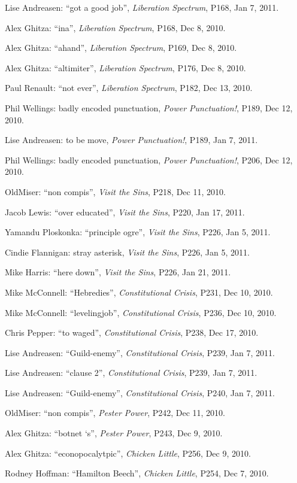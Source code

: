 \begin{flushleft}
Lise Andreasen: “got a good job”, \emph{Liberation Spectrum}, P168, 
Jan 7, 2011.

Alex Ghitza: “ina”, \emph{Liberation Spectrum}, P168, Dec 8, 2010.

Alex Ghitza: “ahand”, \emph{Liberation Spectrum}, P169, Dec 8, 2010.

Alex Ghitza: “altimiter”, \emph{Liberation Spectrum}, P176, Dec 8, 
2010.

Paul Renault: “not ever”, \emph{Liberation Spectrum}, P182, Dec 13, 
2010.

Phil Wellings: badly encoded punctuation, \emph{Power Punctuation!}, 
P189, Dec 12, 2010.

Lise Andreasen: to be move, \emph{Power Punctuation!}, P189, Jan 7, 
2011.

Phil Wellings: badly encoded punctuation, \emph{Power Punctuation!}, 
P206, Dec 12, 2010.

OldMiser: “non compis”, \emph{Visit the Sins}, P218, Dec 11, 2010.

Jacob Lewis: “over educated”, \emph{Visit the Sins}, P220, Jan 17, 
2011.

Yamandu Ploskonka: “principle ogre”, \emph{Visit the Sins}, P226, 
Jan 5, 2011.

Cindie Flannigan: stray asterisk, \emph{Visit the Sins}, P226, Jan 5, 
2011.

Mike Harris: “here down”, \emph{Visit the Sins}, P226, Jan 21, 2011.

Mike McConnell: “Hebredies”, \emph{Constitutional Crisis}, P231, 
Dec 10, 2010.

Mike McConnell: “levelingjob”, \emph{Constitutional Crisis}, P236, 
Dec 10, 2010.

Chris Pepper: “to waged”, \emph{Constitutional Crisis}, P238, Dec 
17, 2010.

Lise Andreasen: “Guild-enemy”, \emph{Constitutional Crisis}, P239, 
Jan 7, 2011.

Lise Andreasen: “clause 2”, \emph{Constitutional Crisis}, P239, Jan 
7, 2011.

Lise Andreasen: “Guild-enemy”, \emph{Constitutional Crisis}, P240, 
Jan 7, 2011.

OldMiser: “non compis”, \emph{Pester Power}, P242, Dec 11, 2010.

Alex Ghitza: “botnet `s”, \emph{Pester Power}, P243, Dec 9, 2010.

Alex Ghitza: “econopocalytpic”, \emph{Chicken Little}, P256, Dec 9, 
2010.

Rodney Hoffman: “Hamilton Beech”, \emph{Chicken Little}, P254, Dec 
7, 2010.


\end{flushleft}
